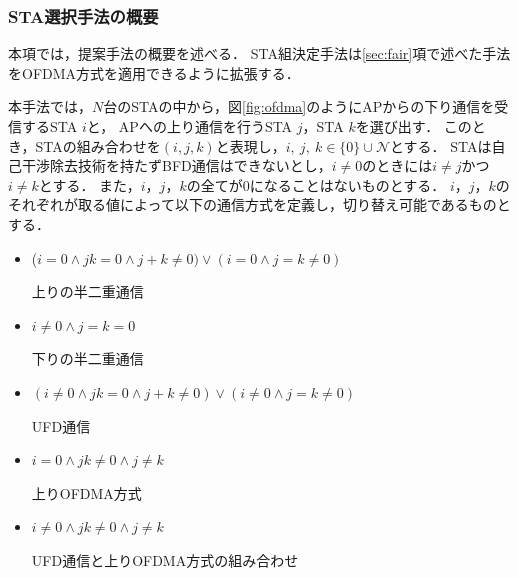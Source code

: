 \documentclass[master]{kuisthesis}		%
\newcommand{\mN}{{\mathcal N}}
\newcommand{\sijk}{(i,j,k)}
\begin{document}
			\subsubsection{STA選択手法の概要}\label{sec:pair_def}
				本項では，提案手法の概要を述べる．
				STA組決定手法は\ref{sec:fair}項で述べた手法をOFDMA方式を適用できるように拡張する．
				\par
				本手法では，$N$台のSTAの中から，図\ref{fig:ofdma}のようにAPからの下り通信を受信するSTA $i$と，
				APへの上り通信を行うSTA $j$，STA $k$を選び出す．
				このとき，STAの組み合わせを$\sijk$と表現し，$i,\ j,\ k \in \{0\}\cup \mN$とする．
				STAは自己干渉除去技術を持たずBFD通信はできないとし，$i\neq0$のときには$i\neq j$かつ$i\neq k$とする．
				また，$i$，$j$，$k$の全てが0になることはないものとする．
				$i$，$j$，$k$のそれぞれが取る値によって以下の通信方式を定義し，切り替え可能であるものとする．
				\begin{itemize}%
					\item ($i=0\land jk=0\land j+k\neq0)\lor (i=0\land j=k\neq0)$\par
					\hspace*{15pt}上りの半二重通信
					\item $i\neq0\land j=k=0$\par
					\hspace*{15pt}下りの半二重通信
					\item $(i\neq0\land jk=0 \land j+k\neq0)\lor(i\neq0\land j=k\neq0)$\par
					\hspace*{15pt}UFD通信
					\item $i=0\land jk\neq0 \land j\neq k$\par
					\hspace*{15pt}上りOFDMA方式
					\item $i\neq0 \land jk\neq0 \land j\neq k$\par
					\hspace*{15pt}UFD通信と上りOFDMA方式の組み合わせ
				\end{itemize}
				\par
\end{document}
